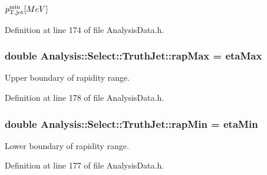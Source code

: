 $ p_{\rm T,jet}^{\rm min} [MeV] $ 



Definition at line 174 of file Analysis\+Data.\+h.

\subsubsection[{\texorpdfstring{rap\+Max}{rapMax}}]{\setlength{\rightskip}{0pt plus 5cm}double Analysis\+::\+Select\+::\+Truth\+Jet\+::rap\+Max = {\bf eta\+Max}\hspace{0.3cm}{\ttfamily [static]}}\hypertarget{namespaceAnalysis_1_1Select_1_1TruthJet_a1f15c201f6726e1fb1251c65df7204cf}{}\label{namespaceAnalysis_1_1Select_1_1TruthJet_a1f15c201f6726e1fb1251c65df7204cf}


Upper boundary of rapidity range. 



Definition at line 178 of file Analysis\+Data.\+h.

\subsubsection[{\texorpdfstring{rap\+Min}{rapMin}}]{\setlength{\rightskip}{0pt plus 5cm}double Analysis\+::\+Select\+::\+Truth\+Jet\+::rap\+Min = {\bf eta\+Min}\hspace{0.3cm}{\ttfamily [static]}}\hypertarget{namespaceAnalysis_1_1Select_1_1TruthJet_ac25d5e19383f354b51fb4eec2d0b5d97}{}\label{namespaceAnalysis_1_1Select_1_1TruthJet_ac25d5e19383f354b51fb4eec2d0b5d97}


Lower boundary of rapidity range. 



Definition at line 177 of file Analysis\+Data.\+h.

